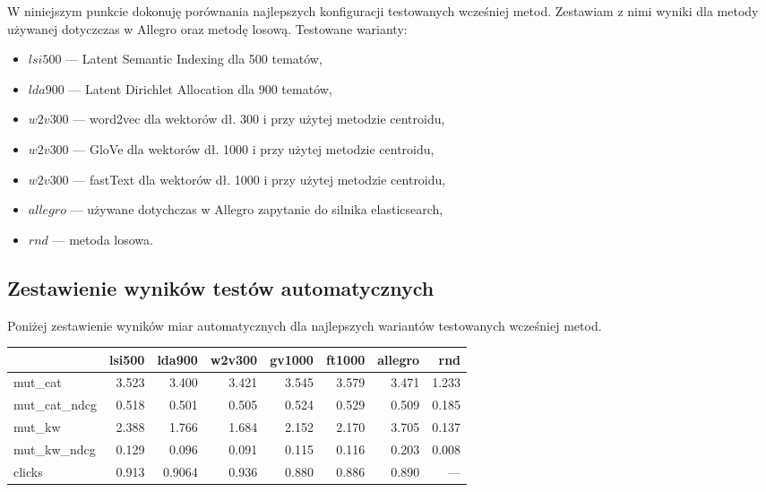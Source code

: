 \documentclass[pl]{minipw} %
\begin{document}
W niniejszym punkcie dokonuję porównania najlepszych konfiguracji testowanych wcześniej metod. Zestawiam z nimi wyniki dla metody używanej dotyczczas w Allegro oraz metodę losową.
Testowane warianty:
\begin{itemize}
	\item $lsi500$ --- Latent Semantic Indexing dla 500 tematów,
	\item $lda900$ --- Latent Dirichlet Allocation dla 900 tematów,
	\item $w2v300$ --- word2vec dla wektorów dł. 300 i przy użytej metodzie centroidu,
	\item $w2v300$ --- GloVe dla wektorów dł. 1000 i przy użytej metodzie centroidu,
	\item $w2v300$ --- fastText dla wektorów dł. 1000 i przy użytej metodzie centroidu,
	\item $allegro$ --- używane dotychczas w Allegro zapytanie do silnika elasticsearch,
	\item $rnd$ --- metoda losowa.
\end{itemize}
\subsection{Zestawienie wyników testów automatycznych}
Poniżej zestawienie wyników miar automatycznych dla najlepszych wariantów testowanych wcześniej metod.
\begin{center}
	\begin{tabular}{lrrrrrrr}
		\hline
		&   lsi500 &    lda900 &    w2v300 &   gv1000 &   ft1000 &   allegro &          rnd \\
		\hline
		mut\_cat      & 3.523  & 3.400   & 3.421   & 3.545  & 3.579  &  3.471  &   1.233    \\
		mut\_cat\_ndcg & 0.518 & 0.501  & 0.505  & 0.524 & 0.529 &  0.509 &   0.185    \\
		mut\_kw       & 2.388  & 1.766   & 1.684   & 2.152  & 2.170  &  3.705  &   0.137   \\
		mut\_kw\_ndcg  & 0.129 & 0.096 & 0.091 & 0.115 & 0.116 &  0.203 &   0.008 \\
		clicks       & 0.913 & 0.9064  & 0.936  & 0.880 & 0.886 &  0.890 & ---          \\
		\hline
	\end{tabular}
\end{center}
\end{document}
